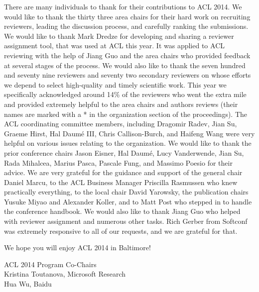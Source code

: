 \begin{large}
There are many individuals to thank for their contributions to ACL
2014. We would like to thank the thirty three area chairs for their
hard work on recruiting reviewers, leading the discussion process, and
carefully ranking the submissions.  We would like to thank Mark Dredze
for developing and sharing a reviewer assignment tool, that was used
at ACL this year. It was applied to ACL reviewing with the help of
Jiang Guo and the area chairs who provided feedback at several stages
of the process. We would also like to thank the seven hundred and
seventy nine reviewers and seventy two secondary reviewers on whose
efforts we depend to select high-quality and timely scientific
work. This year we specifically acknowledged around 14\% of the
reviewers who went the extra mile and provided extremely helpful to
the area chairs and authors reviews (their names are marked with a *
in the organization section of the proceedings). The ACL coordinating
committee members, including Dragomir Radev, Jian Su, Graeme Hirst,
Hal Daum\'{e} III, Chris Callison-Burch, and Haifeng Wang were very
helpful on various issues relating to the organization.  We would like
to thank the prior conference chairs Jason Eisner, Hal Daum\'{e}, Lucy
Vanderwende, Jian Su, Rada Mihalcea, Marius Pasca, Pascale Fung, and
Massimo Poesio for their advice. We are very grateful for the guidance
and support of the general chair Daniel Marcu, to the ACL Business
Manager Priscilla Rasmussen who knew practically everything, to the
local chair David Yarowsky, the publication chairs Yusuke Miyao and
Alexander Koller, and to Matt Post who stepped in to handle the
conference handbook. We would also like to thank Jiang Guo who helped
with reviewer assignment and numerous other tasks. Rich Gerber from
Softconf was extremely responsive to all of our requests, and we are
grateful for that.

We hope you will enjoy ACL 2014 in Baltimore!

\vspace{.2in}
ACL 2014 Program Co-Chairs\\
\indent Kristina Toutanova, Microsoft Research\\
\indent Hua Wu, Baidu

\end{large}
